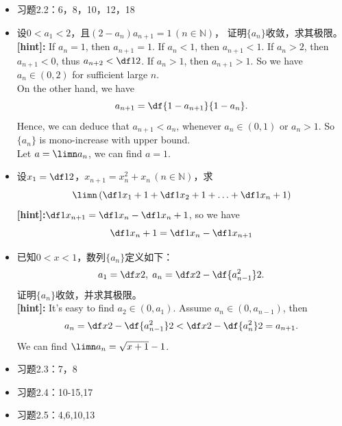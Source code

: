 \begin{itemize}
  \item 习题2.2：6，8，10，12，18
  \item 设$0<a_1<2$，且$(2-a_n)a_{n+1}=1\,(n\in\mathbb{N})$，
  	证明$\{a_n\}$收敛，求其极限。\\
  {\bf [hint]:} If $a_n=1$, then $a_{n+1}=1$. If $a_n<1$, then $a_{n+1}<1$.
  If $a_n>2$, then $a_{n+1}<0$, thus $a_{n+2}<\df12$. If $a_n>1$, then 
  $a_{n+1}>1$. So we have $a_n\in(0,2)$ for sufficient large $n$.\\
  On the other hand, we have
  $$a_{n+1}=\df{1-a_{n+1}}{1-a_n}.$$
  Hence, we can deduce that $a_{n+1}<a_n$, whenever $a_n\in(0,1)$ or 
  $a_n>1$. So $\{a_n\}$ is mono-increase with upper bound.\\
  Let $a=\limn a_n$, we can find $a=1$.
  \item 设$x_1=\df 12$，$x_{n+1}=x_n^2+x_n\,(n\in\mathbb{N})$，求
	$$\limn\left(\df 1{x_1+1}+\df 1{x_2+1}+\ldots+\df
	1{x_n+1}\right)$$
  {\bf [hint]:}$\df1{x_{n+1}}=\df1{x_n}-\df1{x_n+1}$, so we have
  $$\df1{x_n+1}=\df1{x_n}-\df1{x_{n+1}}$$
  \item 已知$0<x<1$，数列$\{a_n\}$定义如下：
	$$a_1=\df x2,\;a_n=\df x2-\df{a_{n-1}^2}2.$$
	证明$\{a_n\}$收敛，并求其极限。\\
  {\bf [hint]:} It's easy to find $a_2\in(0,a_1)$. Assume $a_{n}\in
  (0,a_{n-1})$, then
  $$a_n=\df x2-\df{a_{n-1}^2}2<\df x2-\df{a_{n}^2}2=a_{n+1}.$$
  We can find $\limn a_n=\sqrt{x+1}-1$.
  \item 习题2.3：7，8 
  \item 习题2.4：10-15,17
  \item 习题2.5：4,6,10,13
\end{itemize}